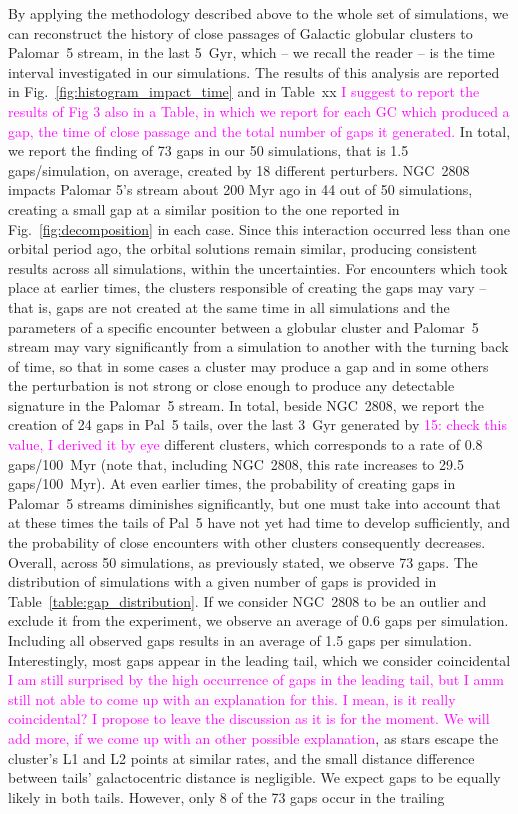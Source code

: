 \documentclass[draft]{aa}
\newcommand{\paola}[1]{\textcolor{magenta}{{#1}}}
\begin{document}
  

    By applying the methodology described above to the whole set of simulations, we can reconstruct the history of close passages of Galactic globular clusters to Palomar~5 stream, in the last 5~Gyr, which -- we recall the reader -- is the time interval investigated in our simulations. The results of this analysis are reported in Fig.~\ref{fig:histogram_impact_time} and in Table~xx \paola{I suggest to report the results of Fig 3 also in a Table, in which we report for each GC which produced a gap, the time of close passage and the total number of gaps it generated.} In total, we report the finding of 73 gaps in our 50 simulations, that is 1.5 gaps/simulation, on average, created by 18 different perturbers. NGC~2808 impacts Palomar 5's stream about 200 Myr ago in 44 out of 50 simulations, creating a small gap at a similar position to the one reported in Fig.~\ref{fig:decomposition}  in each case. Since this interaction occurred less than one orbital period ago, the orbital solutions remain similar, producing consistent results across all simulations, within the uncertainties.  For encounters which took place at earlier times, the clusters responsible of creating the gaps may vary -- that is, gaps are not created at the same time in all simulations and the parameters of a specific encounter between a  globular cluster and Palomar~5 stream may vary significantly from a simulation to another with the turning back of time, so that in some cases a cluster may produce a gap and in some others the perturbation is not strong or close enough to produce any detectable signature in the Palomar~5 stream.  In total, beside NGC~2808, we report the creation of 24 gaps in Pal~5 tails, over the last 3~Gyr generated by \paola{15: check this value, I derived it by eye} different clusters, which corresponds to a rate of 0.8 gaps/100~Myr (note that, including NGC~2808, this rate increases to 29.5 gaps/100~Myr). At even earlier times, the probability of creating gaps in Palomar~5 streams diminishes significantly, but one must take into account that at these times the tails of Pal~5 have not yet had time to develop sufficiently, and the probability of close encounters with other clusters consequently decreases. Overall, across 50 simulations, as previously stated, we observe 73 gaps. The distribution of simulations with a given number of gaps is provided in Table~\ref{table:gap_distribution}.  If we consider NGC~2808 to be an outlier and exclude it from the experiment, we observe an average of 0.6 gaps per simulation. Including all observed gaps results in an average of 1.5 gaps per simulation. Interestingly, most gaps appear in the leading tail, which we consider coincidental \paola{I am still surprised by the high occurrence of gaps in the leading tail, but I amm still not able to come up with an explanation for this. I mean, is it really coincidental? I propose to leave the discussion as it is for the moment. We will add more, if we come up with an other possible explanation}, as stars escape the cluster's L1 and L2 points at similar rates, and the small distance difference between tails' galactocentric distance is negligible. We expect gaps to be equally likely in both tails. However, only 8 of the 73 gaps occur in the trailing 
\end{document}
